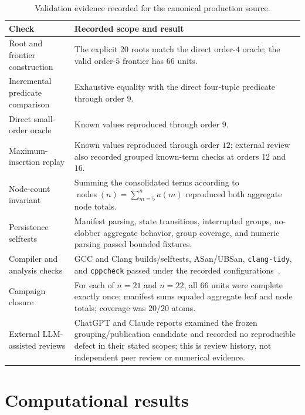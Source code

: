 \documentclass[11pt]{article}
\theoremstyle{definition}
\theoremstyle{remark}
\begin{document}
\clearpage
\begin{table}[!t]
\centering
\caption{Validation evidence recorded for the canonical production source.}
\label{tab:validation}
\begin{tabular}{L{0.36\textwidth}L{0.47\textwidth}}
\toprule
Check & Recorded scope and result \\
\midrule
Root and frontier construction & The explicit 20 roots match the direct
  order-$4$ oracle; the valid order-$5$ frontier has 66 units. \\
Incremental predicate comparison & Exhaustive equality with the direct
  four-tuple predicate through order $9$. \\
Direct small-order oracle & Known values reproduced through order $9$. \\
Maximum-insertion replay & Known values reproduced through order $12$;
  external review also recorded grouped known-term checks at orders $12$ and
  $16$. \\
Node-count invariant & Summing the consolidated terms according to
  $\operatorname{nodes}(n)=\sum_{m=5}^{n}a(m)$ reproduced both aggregate node
  totals. \\
Persistence selftests & Manifest parsing, state transitions, interrupted
  groups, no-clobber aggregate behavior, group coverage, and numeric parsing
  passed bounded fixtures. \\
Compiler and analysis checks & GCC and Clang builds/selftests, ASan/UBSan,
  \texttt{clang-tidy}, and \texttt{cppcheck} passed under the recorded
  configurations~\cite{llvmSanitizers,llvmClangTidy,cppcheckManual}. \\
Campaign closure & For each of $n=21$ and $n=22$, all 66 units were complete
  exactly once; manifest sums equaled aggregate leaf and node totals; coverage
  was $20/20$ atoms. \\
External LLM-assisted reviews & ChatGPT and Claude reports examined the frozen
  grouping/publication candidate and recorded no reproducible defect in their
  stated scopes; this is review history, not independent peer review or
  numerical evidence. \\
\bottomrule
\end{tabular}
\end{table}
\FloatBarrier

\section{Computational results}
\label{sec:results}
\end{document}
